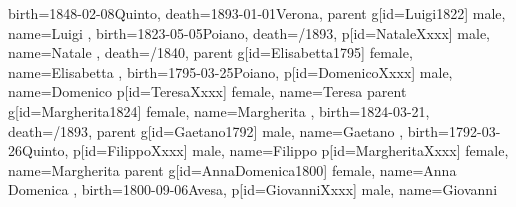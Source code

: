 \documentclass{article}
\begin{document}
\begin{midpage}
\begin{center}
\begin{genealogypicture}
{{{{{{                        birth={1848-02-08}{Quinto},
                        death={1893-01-01}{Verona},
                    }
                    parent{
                        g[id=Luigi1822]{
                            male,
                            name={Luigi },
                            birth={1823-05-05}{Poiano},
                            death={/1893}{},
                        }
                        p[id=NataleXxxx]{
                            male,
                            name={Natale },
                            death={/1840}{},
                        }
                        parent{
                            g[id=Elisabetta1795]{
                                female,
                                name={Elisabetta },
                                birth={1795-03-25}{Poiano},
                            }
                            p[id=DomenicoXxxx]{
                                male,
                                name={Domenico }
                            }
                            p[id=TeresaXxxx]{
                                female,
                                name={Teresa }
                            }
                        }
                    }
                    parent{
                        g[id=Margherita1824]{
                            female,
                            name={Margherita },
                            birth={1824-03-21}{},
                            death={/1893}{},
                        }
                        parent{
                            g[id=Gaetano1792]{
                                male,
                                name={Gaetano },
                                birth={1792-03-26}{Quinto},
                            }
                            p[id=FilippoXxxx]{
                                male,
                                name={Filippo }
                            }
                            p[id=MargheritaXxxx]{
                                female,
                                name={Margherita}
                            }
                        }
                        parent{
                            g[id=AnnaDomenica1800]{
                                female,
                                name={Anna Domenica },
                                birth={1800-09-06}{Avesa},
                            }
                            p[id=GiovanniXxxx]{
                                male,
                                name={Giovanni }
}}}}}}}}
\end{genealogypicture}
\end{center}
\end{midpage}
\end{document}
